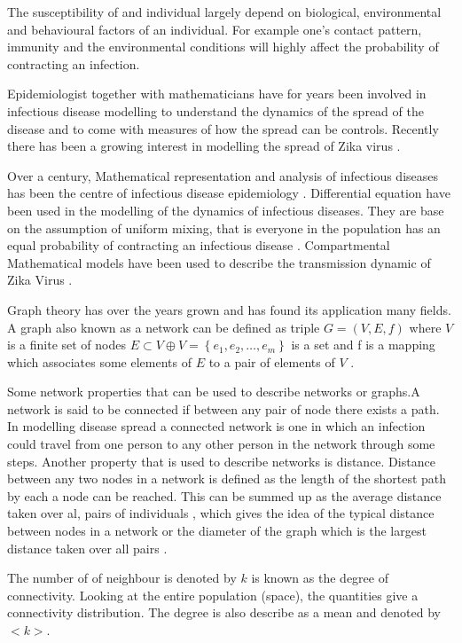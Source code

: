 The susceptibility of and individual largely depend on biological, environmental and behavioural factors of an individual. For example one's contact pattern, immunity and the environmental conditions will highly affect the probability of contracting an infection.

Epidemiologist together with mathematicians have for years been involved in infectious disease modelling to understand the dynamics of the spread of the disease and to come with measures of how the spread can be controls. Recently there has been a growing interest in modelling the spread of Zika virus \citep{ku2016}.

Over a  century, Mathematical representation and analysis of infectious diseases has been the centre of  infectious disease epidemiology \citep{b2005}. Differential equation have been used in the modelling of the dynamics of infectious diseases. They are base on the assumption of uniform mixing, that is everyone in the population has an equal probability of contracting an infectious disease \citep{kaplan2002emergency}.
Compartmental Mathematical models have been used to describe the transmission dynamic of Zika Virus \citep{gao2016}.

Graph theory has over the years grown and has found its application many fields. A graph also known as a network   can be  defined as triple $G = (V,E,f)$ where $V$ is a finite set of nodes $E \subset V \oplus V = \left\lbrace e_1,e_2,\dots ,e_m \right\rbrace$ is a set and f is a mapping which associates some elements of $E$ to a pair of elements of $V$ \citep{estrada2012structure}.

Some network properties that can be used to describe networks or graphs.A network is said to be connected if between any pair of node there exists a path. In modelling disease spread a connected network is one in which an infection could travel from one person to any other person in the network through some steps. Another property that is used to describe networks is distance. Distance between any two nodes in a network is defined as the length of the shortest path by each a node can be reached. This can be summed up as the average distance taken over al, pairs of individuals , which gives the idea of the typical distance between nodes in a network or the diameter of the graph which is the largest distance taken over all pairs \citep{chung2002average}.

The number of of neighbour is denoted by $k$ is known as the degree of connectivity. Looking at the entire population (space), the quantities  give a connectivity distribution. The degree is also describe as a mean and denoted by $<k>$.

